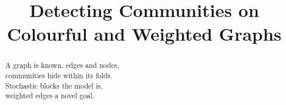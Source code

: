 \documentclass{article}
\begin{document}
\title{Detecting Communities on Colourful and Weighted Graphs}
\maketitle

\begin{abstract}
\centering
\noindent 
A graph is known, edges and nodes, \\
communities hide within its folds. \\
Stochastic blocks the model is, \\
weighted edges a novel goal.
\end{abstract}

\tableofcontents


\begin{comment}
\section{General Discrete Likelihood}

Let the parameter space be the following:

\[
\Theta(\sigma, n, K, P, Q) = \{
   \sigma: [n] \rightarrow K, \, P, Q \textrm{ distributions} \}
\]

The graph adjacency matrix is generated as such:
\[
\begin{array}{cc}
A_{ij} \sim P & \trm{if } \sigma(i) = \sigma(j) \\
A_{ij} \sim Q & \trm{if } \sigma(i) \neq \sigma(j) 
\end{array}
\]

Suppose $P, Q$ are known, the likelihood function becomes:
\[
L(\sigma) = \sum_{i<j} \log P(A_{ij}) \mathbf{1}_{\sigma(i) = \sigma(j)} + 
  \sum_{i<j} \log Q(A_{ij}) \mathbf{1}_{\sigma(i) \neq \sigma(j)}
\]
Since $1 - \mathbf{1}_{sigma(i) \neq \sigma(j)} = \mathbf{1}_{\sigma(i) = \sigma(j)}$, we have that
\begin{align*}
L(\sigma) = \sum_{i<j} \log \frac{P(A_{ij})}{Q(A_{ij})} \mathbf{1}_{\sigma(i) = \sigma(j)} + \sum_{i<j} \log Q(A_{ij})
\end{align*}
We can safely discard the second term since it is a constant for any $\sigma$. We turn to the case where $P,Q$ are general discrete distributions with domain size $L$. It is straightforward to see that
\[
\begin{array}{cc}
\log P(A_{ij}) = & \sum_{l=1}^L \mathbf{1}_{A_{ij} = l} \log P_l \\
\log Q(A_{ij}) = & \sum_{l=1}^L \mathbf{1}_{A_{ij} = l} \log Q_l
\end{array}
\]
The same summation form similarly holds for $\log \frac{P(A_{ij})}{Q(A_{ij})}$. 


\end{comment}
\end{document}
